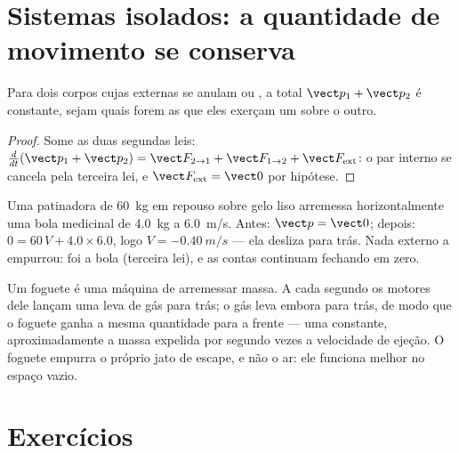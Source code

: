 \section{Sistemas isolados: a quantidade de movimento se conserva}

\begin{proposition}\label{prop:g12:newtons-laws:conservation}
Para dois corpos cujas  externas se anulam ou , a  total $\vect p_1 + \vect p_2$ é constante, sejam quais forem as  que
eles exerçam um sobre o outro.
\end{proposition}

\begin{proof}
Some as duas segundas leis:
$\frac{d}{dt}(\vect p_1 + \vect p_2) = \vect F_{2 \to 1} + \vect F_{1 \to 2} +
\vect F_{\text{ext}}$: o par interno se cancela pela terceira lei, e
$\vect F_{\text{ext}} = \vect 0$ por hipótese.
\end{proof}

\begin{example}[Recuo]\label{ex:g12:newtons-laws:recoil}
Uma patinadora de \qty{60}{kg} em repouso sobre gelo liso arremessa horizontalmente
uma bola medicinal de \qty{4.0}{kg} a \qty{6.0}{m/s}. Antes: $\vect p = \vect 0$;
depois: $0 = 60\,V + 4.0 \times 6.0$, logo $V = \qty{-0.40}{m/s}$ --- ela desliza para
trás. Nada externo a empurrou: foi a bola (terceira lei), e as contas continuam
fechando em zero.
\end{example}

\begin{remark}\label{rem:g12:newtons-laws:rocket}
Um foguete é uma máquina de arremessar massa. A cada segundo os motores dele lançam
uma leva de gás para trás; o gás leva embora  para trás, de
modo que o foguete ganha a mesma quantidade para a frente --- uma  constante,
aproximadamente a massa expelida por segundo vezes a velocidade de ejeção. O foguete
empurra o próprio jato de escape, e não o ar: ele funciona melhor no espaço vazio.
\end{remark}

\section{Exercícios}

